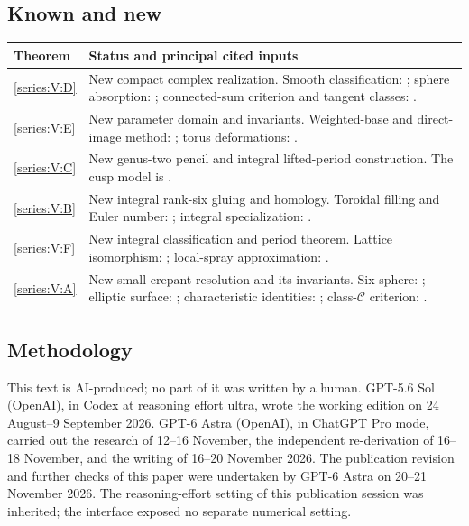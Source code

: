 \documentclass[11pt,a4paper]{article}
\numberwithin{equation}{section}
\theoremstyle{definition}
\begin{document}
\subsection{Known and new}\label{pub:V:known-new}
\begin{center}\small
\begin{tabularx}{\textwidth}{@{}lX@{}}\toprule
Theorem & Status and principal cited inputs\\\midrule
\ref{series:V:D} & New compact complex realization. Smooth classification: \cite[Definition~3.6 and Theorem~3.7(1), arXiv v3, pp.~12--14]{IVVWallForm}; sphere absorption: \cite[Theorem~A, p.~178]{IVVKramerStolz}; connected-sum criterion and tangent classes: \cite[Corollary~1.4, p.~4, Lemma~2.1, p.~5, and Theorem~2.4, p.~7]{ffMandal}.\\
\ref{series:V:E} & New parameter domain and invariants. Weighted-base and direct-image method: \cite[Lemmas~6.1--6.2, pp.~74--75, Proposition~6.10, pp.~79--80]{DGKX2026v1}; torus deformations: \cite[Theorem~2.1, p.~264]{Catanese2004}.\\
\ref{series:V:C} & New genus-two pencil and integral lifted-period construction. The cusp model is \cite[Theorem~8.7, arXiv v1, pp.~57--59]{Yang2026}.\\
\ref{series:V:B} & New integral rank-six gluing and homology. Toroidal filling and Euler number: \cite[Theorem~8.7 and Corollary~8.8, arXiv v1, pp.~57--59]{Yang2026}; integral specialization: \cite[\S7.7, pp.~60--63]{AC26}.\\
\ref{series:V:F} & New integral classification and period theorem. Lattice isomorphism: \cite[Theorem~3.4, p.~6, Algorithm~8.3, p.~21]{rootBHJ22}; local-spray approximation: \cite[Proposition~7.13 and preceding paragraph, arXiv v5, pp.~23--24]{IVVOkaOneV5}.\\
\ref{series:V:A} & New small crepant resolution and its invariants. Six-sphere: \cite[Theorems~7.17 and~7.22, pp.~57 and~60]{AC26}; elliptic surface: \cite[\S2, arXiv v1, p.~3]{E26}; characteristic identities: \cite[(1.2)--(1.4), pp.~3--4]{ffEsoleKang}; class-$\mathcal C$ criterion: \cite[Theorem~1.1, Remark~1.2, p.~2]{ffJiaMeng}.\\
\bottomrule\end{tabularx}\end{center}
\subsection{Methodology}
This text is AI-produced; no part of it was written by a human.
GPT-5.6 Sol (OpenAI), in Codex at reasoning effort ultra, wrote the
working edition on 24 August--9 September 2026. GPT-6 Astra (OpenAI),
in ChatGPT Pro mode, carried out the research of 12--16 November,
the independent re-derivation of 16--18 November, and the writing of
16--20 November 2026. The publication revision and further checks of
this paper were undertaken by GPT-6 Astra on 20--21 November 2026.
The reasoning-effort setting of this publication session was inherited;
the interface exposed no separate numerical setting.
\end{document}
